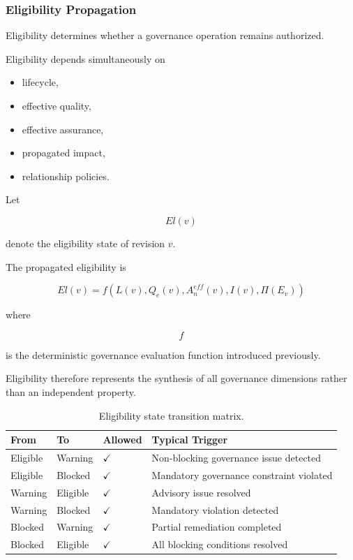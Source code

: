 \documentclass[10pt]{article}
\begin{document}
\subsubsection{Eligibility Propagation}

Eligibility determines whether a governance operation remains authorized.

Eligibility depends simultaneously on

\begin{itemize}
	\item lifecycle,
	\item effective quality,
	\item effective assurance,
	\item propagated impact,
	\item relationship policies.
\end{itemize}

Let

\[
El(v)
\]

denote the eligibility state of revision
$v$.

The propagated eligibility is

\begin{equation}
	El(v)
	=
	f
	\left(
	L(v),
	Q_e(v),
	A_n^{eff}(v),
	I(v),
	\Pi(E_v)
	\right)
	\label{eq:eligibility_propagation}
\end{equation}

where

\[
f
\]

is the deterministic governance evaluation function introduced previously.

Eligibility therefore represents the synthesis of all governance dimensions
rather than an independent property.

\begin{table}[ht]
	\caption{Eligibility state transition matrix.}
	\label{tab:eligibility_transition_matrix}
	\centering
	\small
	\begin{tabular}{llll}
		\toprule
		\textbf{From} & \textbf{To} & \textbf{Allowed} & \textbf{Typical Trigger} \\
		\midrule
		Eligible & Warning & $\checkmark$ & Non-blocking governance issue detected \\
		Eligible & Blocked & $\checkmark$ & Mandatory governance constraint violated \\
		Warning & Eligible & $\checkmark$ & Advisory issue resolved \\
		Warning & Blocked & $\checkmark$ & Mandatory violation detected \\
		Blocked & Warning & $\checkmark$ & Partial remediation completed \\
		Blocked & Eligible & $\checkmark$ & All blocking conditions resolved \\
		\bottomrule
	\end{tabular}
\end{table}
\end{document}
